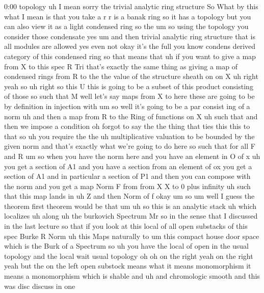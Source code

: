 \begin{unfinished}{0:00}
topology  uh  I  mean  sorry  the  trivial
analytic  ring  structure  So  What  by  this
what  I  mean  is  that  you  take  a  r  r  is  a
banak  ring  so  it  has  a  topology  but  you
can  also  view  it  as  a  light  condensed
ring  so  the
um  so  using  the  topology  you  consider
those
condensate
yes  um  and  then  trivial  analytic  ring
structure  that
is  all  modules  are  allowed  yes  even  not
okay  it's  the  full  you  know  condens
derived  category  of  this  condensed  ring
so  that  means  that  uh  if  you  want  to
give  a  map  from  X  to  this  spec
R  Tri  that's  exactly  the  same  thing  as
giving  a  map  of  condensed  rings  from  R
to  the  the  value  of  the  structure  sheath
on  on
X  uh  right  yeah  so  uh  right  so  this  U
this  is  going  to  be  a  subset  of  this
product  consisting  of  those  so  such  that
M  well  let's  say  maps  from  X  to  here
these  are  going  to  be  by  definition  in
injection
with  um  so  well  it's  going  to  be  a  par
consist  ing  of  a
norm  uh  and  then  a  map  from  R  to  the
Ring  of  functions  on
X  uh  such
that  and  then  we  impose  a  condition
oh  forgot  to  say  the  the  thing  that  ties
this  this  to  that  so
uh  you  require
the  the  uh  multiplicative  valuation  to
be  bounded  by  the  given  norm  and  that's
exactly  what  we're  going  to  do  here  so
such  that  for  all  F  and
R  um  so  when  you  have  the  norm  here  and
you  have  an  element  in  O  of  x  uh  you  get
a  section  of  A1  and  you  have  a  section
from  an  element  of  ox  you  get  a  section
of  A1  and  in  particular  a  section  of  P1
and  then  you  can  compose  with  the  norm
and  you  get  a  map  Norm  F  from  from
X  X  to  0  plus  infinity  uh  such  that  this
map  lands
in  uh  Z  and  then  Norm  of
f
okay
um  so  um  well  I  guess  the  theorem  first
theorem  would  be  that
um  uh  so  this  is  an  analytic
stack  uh  which
localizes
uh
along  uh  the  burkovich  Spectrum
Mr  so  in  the  sense  that
I  discussed  in  the  last  lecture  so  that
if  you  look  at  this  local  of  all  open
substacks  of  this  spec
Burke  R  Norm  uh  this  Maps  naturally
to
um  this  compact  house  door  space  which
is  the  Burk  of  a  Spectrum  so  uh  you  have
the  local  of  open  in  the  usual  topology
and  the  local  wait  usual
topology  oh  oh  on  the  right  yeah  on  the
right  yeah  but  the  on  the  left  open
substock  means  what  it  means
monomorphism  it  means  a  monomorphism
which  is
shable  and  uh  and  chromologic
smooth  and  this  was  disc  discuss  in  one

\end{unfinished}
